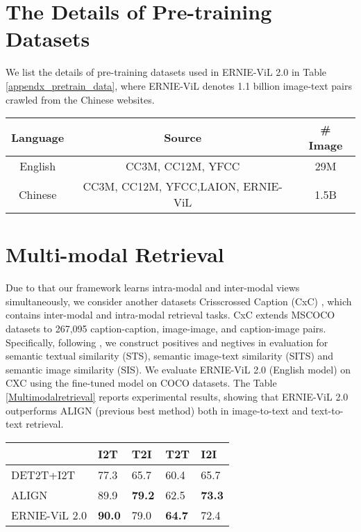 \documentclass{article}
\begin{document}
  
  
\newpage



\appendix
\section{The Details of Pre-training Datasets}
We list the details of pre-training datasets used in ERNIE-ViL 2.0 in Table \ref{appendx_pretrain_data}, where ERNIE-ViL denotes 1.1 billion image-text pairs crawled from the Chinese websites.
\begin{table*}[]
\centering
\begin{tabular}{ccc}
\toprule
Language & Source & \# Image \\ \midrule
English & CC3M, CC12M, YFCC & 29M \\
Chinese & CC3M, CC12M, YFCC,LAION, ERNIE-ViL & 1.5B \\ \bottomrule
\end{tabular}
\caption{The details of pre-training datasets used in ERNIE-ViL 2.0}
\label{appendx_pretrain_data}
\end{table*}
\section{Multi-modal Retrieval}
\label{Multi-modal_retrieval}
Due to that our framework learns intra-modal and inter-modal views simultaneously, we consider another datasets Crisscrossed Caption (CxC) \cite{parekh2020crisscrossed}, which contains inter-modal and intra-modal retrieval tasks. CxC extends MSCOCO datasets to 267,095 caption-caption, image-image, and caption-image pairs. Specifically, following \cite{parekh2020crisscrossed}, we construct positives and negtives in evaluation for  semantic textual similarity (STS), semantic image-text similarity (SITS) and semantic image similarity (SIS). We evaluate ERNIE-ViL 2.0 (English model) on CXC using the fine-tuned model on COCO datasets. The Table \ref{Multimodalretrieval} reports experimental results, showing that ERNIE-ViL 2.0 outperforms ALIGN (previous best method) both in image-to-text and text-to-text retrieval. 

\begin{table*}[]
\centering
\begin{tabular}{lllll}
\toprule
    & I2T  & T2I  & T2T  & I2I  \\ \midrule
DET2T+I2T     & 77.3 & 65.7 & 60.4 & 65.7 \\
ALIGN         & 89.9 & \textbf{79.2} & 62.5 & \textbf{73.3} \\
ERNIE-ViL 2.0 & \textbf{90.0} & 79.0 & \textbf{64.7} & 72.4 \\ \bottomrule
\end{tabular}
\caption{Multimodal retrieval results at Crisscrossed Captions (CxC), compared with multi-modal methods: ALIGN \cite{Jia2021ScalingUV}, DET2T+I2T \cite{parekh2020crisscrossed}. The metric is the meanRecall (mR). I2T: text  image, I2T:image  text, I2I:image  image, T2T: text  text }
\label{Multimodalretrieval}
\end{table*}
\end{document}
